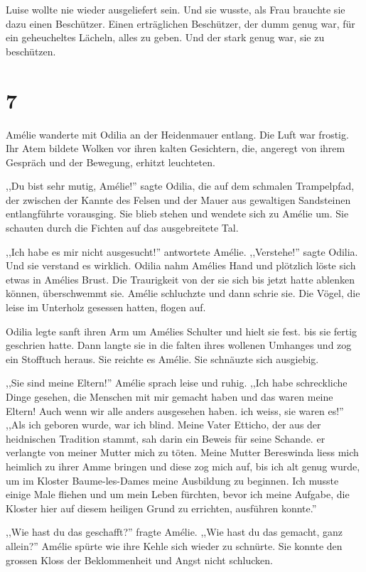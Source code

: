 \documentclass[11pt,titlepage,a5paper]{book}
\begin{document}
Luise wollte nie wieder ausgeliefert sein. Und sie wusste, als Frau brauchte sie dazu einen Beschützer. Einen erträglichen Beschützer, der dumm genug war, für ein geheucheltes Lächeln, alles zu geben. Und der stark genug war, sie zu beschützen.

\section*{7}

Amélie wanderte mit Odilia an der Heidenmauer entlang. Die Luft war frostig. Ihr Atem bildete Wolken vor ihren kalten Gesichtern, die, angeregt von ihrem Gespräch und der Bewegung, erhitzt leuchteten.

,,Du bist sehr mutig, Amélie!'' sagte Odilia, die auf dem schmalen Trampelpfad, der zwischen der Kannte des Felsen und der Mauer aus gewaltigen Sandsteinen entlangführte vorausging. Sie blieb stehen und wendete sich zu Amélie um. Sie schauten durch die Fichten auf das ausgebreitete Tal.

,,Ich habe es mir nicht ausgesucht!'' antwortete Amélie. ,,Verstehe!'' sagte Odilia. Und sie verstand es wirklich.
Odilia nahm Amélies Hand und plötzlich löste sich etwas in Amélies Brust. Die Traurigkeit von der sie sich bis jetzt hatte ablenken können, überschwemmt sie. Amélie schluchzte und dann schrie sie. Die Vögel, die leise im Unterholz gesessen hatten, flogen auf. 

Odilia legte sanft ihren Arm um Amélies Schulter und hielt sie fest. bis sie fertig geschrien hatte. Dann langte sie in die falten ihres wollenen Umhanges und zog ein Stofftuch heraus. Sie reichte es Amélie. Sie schnäuzte sich ausgiebig.

,,Sie sind meine Eltern!'' Amélie sprach leise und ruhig. ,,Ich habe schreckliche Dinge gesehen, die Menschen mit mir gemacht haben und das waren meine Eltern! Auch wenn wir alle anders ausgesehen haben. ich weiss, sie waren es!'' ,,Als ich geboren wurde, war ich blind. Meine Vater Etticho, der aus der heidnischen Tradition stammt, sah darin ein Beweis für seine Schande. er verlangte von meiner Mutter mich zu töten. Meine Mutter Bereswinda liess mich heimlich zu ihrer Amme bringen und diese zog mich auf, bis ich alt genug wurde, um im Kloster Baume-les-Dames meine Ausbildung zu beginnen. Ich musste einige Male fliehen und um mein Leben fürchten, bevor ich meine Aufgabe, die Kloster hier auf diesem heiligen Grund zu errichten, ausführen konnte.''

,,Wie hast du das geschafft?'' fragte Amélie. ,,Wie hast du das gemacht, ganz allein?'' Amélie spürte wie ihre Kehle sich wieder zu schnürte. Sie konnte den grossen Kloss der Beklommenheit und Angst nicht schlucken.
\end{document}
